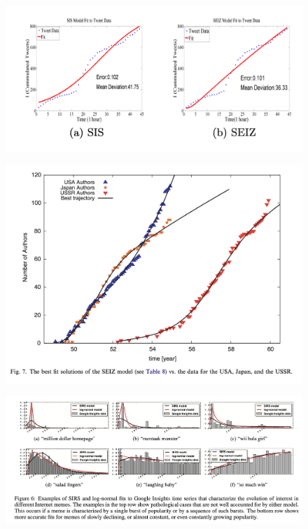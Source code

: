 \newpage


\begin{figure}[!ht] \centering  %
	\caption{\href{https://people.cs.vt.edu/ramakris/papers/news-rumor-epi-snakdd13.pdf}{\cite{jin2013epidemiological}}}
	\label{fig:news_curve}
	\centerline{\includegraphics[width=\textwidth]{./figures/Obama.png}}

\end{figure}


\newpage
\begin{figure}[!ht] \centering  %
	\caption{\href{http://web.mit.edu/dikaiser/www/BAKC.PhysA.pdf}{\cite{bettencourt2006power}}}
	\label{fig:science_ideas_curve}
	\centerline{\includegraphics[width=\textwidth]{./figures/Feynman.png}}

\end{figure}


\newpage
\begin{figure}[!ht] \centering  %
	\caption{\href{https://github.com/iworld1991/EpiExp/blob/master/Literature/bauckhage2011insights.pdf}{\cite{bauckhage2011insights}}}
	\label{fig:memes_curve}
	\centerline{\includegraphics[width=\textwidth]{./figures/Memes.png}}

\end{figure}